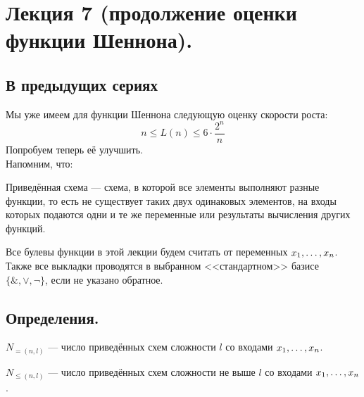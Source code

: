 \section{Лекция 7 (продолжение оценки функции Шеннона).} 
\subsection{В предыдущих сериях}
Мы уже имеем для функции Шеннона следующую оценку скорости роста:
$$n\leq L(n)\leq 6\cdot \frac{2^n}{n}$$
Попробуем теперь её улучшить.\\
Напомним, что:
\begin{definition}
Приведённая схема --- схема, в которой все элементы выполняют разные функции, то есть не существует таких двух одинаковых элементов, на входы которых подаются одни и те же переменные или результаты вычисления других функций.
\end{definition}
Все булевы функции в этой лекции будем считать от переменных $x_1, \ldots, x_n$. Также все выкладки проводятся в выбранном <<стандартном>> базисе $\{\& ,\vee ,\neg\}$, если не указано обратное.
\subsection{Определения.}
\begin{definition}
$N_{=(n,l)}$ --- число приведённых схем сложности $l$ со входами $x_1, \ldots, x_n$.
\end{definition}
\begin{definition}
$N_{\leq(n,l)}$ --- число приведённых схем сложности не выше $l$ со входами $x_1, \ldots, x_n$.
\end{definition}
